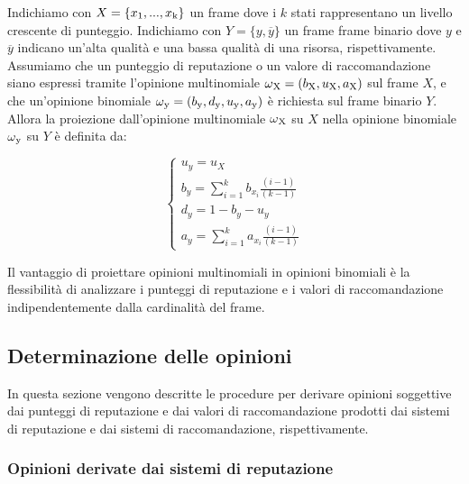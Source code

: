 \documentclass{report}
\begin{document}
	Indichiamo con $X=\{x\textsubscript{1},...,x\textsubscript{k}\}$ un frame dove i $k$ stati rappresentano un
	livello crescente di punteggio. Indichiamo con $Y=\{y,\overline{y}\}$ un frame
	frame binario dove $y$ e $\overline{y}$ indicano un'alta qualità e una bassa qualità
	di una risorsa, rispettivamente. Assumiamo che un punteggio di
	reputazione o un valore di raccomandazione siano espressi tramite
	l'opinione multinomiale $\omega\textsubscript{X}=(b\textsubscript{X},u\textsubscript{X},a\textsubscript{X})$ sul frame $X$, e che un'opinione
	binomiale $\omega\textsubscript{y}=(b\textsubscript{y},d\textsubscript{y},u\textsubscript{y},a\textsubscript{y})$ è richiesta sul frame binario $Y$. Allora la
	proiezione dall'opinione multinomiale $\omega\textsubscript{X}$ su $X$ nella opinione
	binomiale $\omega\textsubscript{y}$ su $Y$ è definita da: 
	
	\begin{center}
	\begin{equation}
	\begin{cases}
		u_y=u_X\\
		b_y=\sum_{i=1}^k b_{x_i} \frac{(i-1)}{(k-1)}\\
		d_y=1-b_y-u_y\\
		a_y=\sum_{i=1}^k a_{x_i} \frac{(i-1)}{(k-1)}
	\end{cases} \label{equazione4}
	\end{equation}
	\end{center}
	
	
	Il vantaggio di proiettare opinioni multinomiali in opinioni binomiali è
	la flessibilità di analizzare i punteggi di reputazione e i valori di
	raccomandazione indipendentemente dalla cardinalità del frame.
	
	\hypertarget{header-n96}{%
		\subsection{Determinazione delle opinioni}\label{header-n96}}
	
	In questa sezione vengono descritte le procedure per derivare opinioni
	soggettive dai punteggi di reputazione e dai valori di raccomandazione
	prodotti dai sistemi di reputazione e dai sistemi di raccomandazione,
	rispettivamente.
	
	\hypertarget{header-n99}{%
		\subsubsection{Opinioni derivate dai sistemi di
			reputazione}\label{header-n99}}
	
\end{document}
